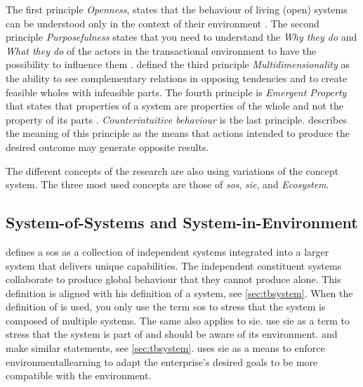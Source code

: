 The first principle \textit{Openness}, states that the behaviour of living (open) systems can be understood only in the context of their environment \parencite[p.~29]{Gharajedaghi2011}. The second principle \textit{Purposefulness} states that you need to understand the \textit{Why they do} and \textit{What they do} of the actors in the transactional environment to have the possibility to influence them \parencite[p.~33]{Gharajedaghi2011}. \textcite[p.~38]{Gharajedaghi2011} defined the third principle \textit{Multidimensionality} as the ability to see complementary relations in opposing tendencies and to create feasible wholes with infeasible parts. The fourth principle is \textit{Emergent Property} that states that properties of a system are properties of the whole and not the property of its parts \parencites{Ackoff1973}{Gharajedaghi2011}. \textit{Counterintuitive behaviour} is the last principle. \textcite[p.~48]{Gharajedaghi2011} describes the meaning of this principle as the means that actions intended to produce the desired outcome may generate opposite results.

The different concepts of the research are also using variations of the concept system. The three most used concepts are those of \textit{\acrfull{sos}}, \textit{\acrfull{sie}}, and \textit{Ecosystem}.

\subsection{System-of-Systems and System-in-Environment}
\label{sub:tbsysofsys}
\textcite{Incose2018} defines a \acrshort{sos} as a collection of independent systems integrated into a larger system that delivers unique capabilities. The independent constituent systems collaborate to produce global behaviour that they cannot produce alone. This definition is aligned with \textcite[p.~664]{Ackoff1973} his definition of a system, see \cref{sec:tbsystem}. When the definition of \textcites{Ackoff1973}{Gharajedaghi2011} is used, you only use the term \acrshort{sos} to stress that the system is composed of multiple systems. The same also applies to \acrshort{sie}. \textcite{Lapalme2012,Korhonen2016} use \acrshort{sie} as a term to stress that the system is part of and should be aware of its environment. \textcite[p.~13--4]{Mannaert2016} and \textcite[p.~183]{Gharajedaghi2011} make similar statements, see \cref{sec:tbsystem}. \textcite[p.~41]{Lapalme2012} uses \acrshort{sie} as a means to enforce \gls{environmentallearning} to adapt the enterprise’s desired goals to be more compatible with the environment.

